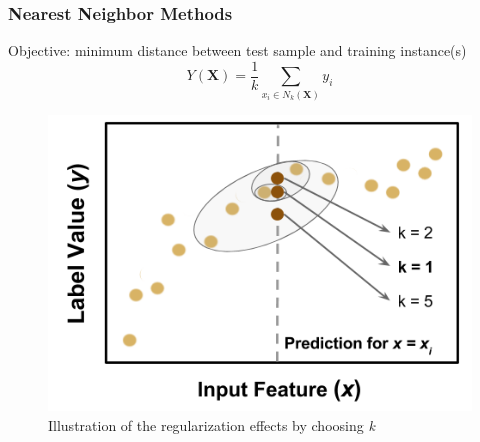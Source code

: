 \begin{frame}
  \frametitle{Nearest Neighbor Methods}
  \begin{minipage}{0.4\textwidth}
    Objective: minimum distance between test sample and training instance(s)
    $$ Y(\boldsymbol{X}) = \frac{1}{k} \sum_{x_i \in N_k(\boldsymbol{X})} y_i $$
  \end{minipage}%
  \begin{minipage}{0.6\textwidth}
    \begin{figure}[h!]
      \centering
      \includegraphics[height=0.5\textheight]{./figures/nn-fig.png}
      \caption{Illustration of the regularization effects by choosing \textit{k}}
    \end{figure}
  \end{minipage}
\end{frame}

